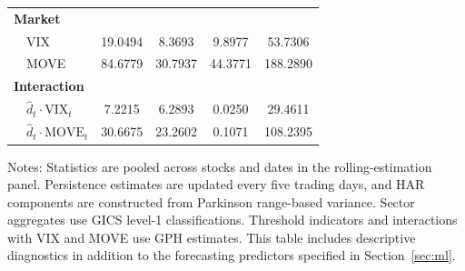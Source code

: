 \begin{table}[htbp]
\begin{tabular}{llcccc}
\midrule
\multicolumn{6}{l}{\textbf{Market}} \\
  & VIX & 19.0494 & 8.3693 & 9.8977 & 53.7306 \\
  & MOVE & 84.6779 & 30.7937 & 44.3771 & 188.2890 \\
\midrule
\multicolumn{6}{l}{\textbf{Interaction}} \\
  & $\hat d_t \cdot \mathrm{VIX}_t$ & 7.2215 & 6.2893 & 0.0250 & 29.4611 \\
  & $\hat d_t \cdot \mathrm{MOVE}_t$ & 30.6675 & 23.2602 & 0.1071 & 108.2395 \\
\bottomrule
\end{tabular}
\begin{tablenotes}\small
\item Notes: Statistics are pooled across stocks and dates in the
rolling-estimation panel. Persistence estimates are updated every five
trading days, and HAR components are constructed from Parkinson range-based
variance. Sector aggregates use GICS level-1 classifications. Threshold
indicators and interactions with VIX and MOVE use GPH estimates. This table includes descriptive
diagnostics in addition to the forecasting predictors specified in
Section~\ref{sec:ml}.
\end{tablenotes}
\end{table}
